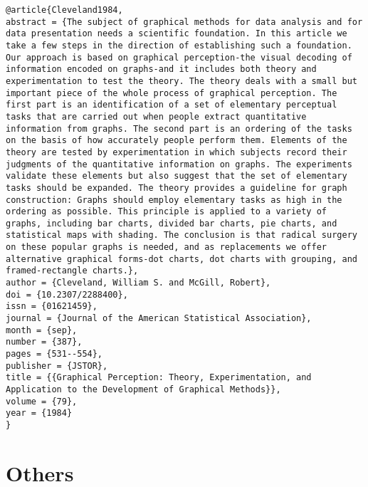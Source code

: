 \documentclass[
]{book}
\begin{document}
\begin{verbatim}
@article{Cleveland1984,
abstract = {The subject of graphical methods for data analysis and for data presentation needs a scientific foundation. In this article we take a few steps in the direction of establishing such a foundation. Our approach is based on graphical perception-the visual decoding of information encoded on graphs-and it includes both theory and experimentation to test the theory. The theory deals with a small but important piece of the whole process of graphical perception. The first part is an identification of a set of elementary perceptual tasks that are carried out when people extract quantitative information from graphs. The second part is an ordering of the tasks on the basis of how accurately people perform them. Elements of the theory are tested by experimentation in which subjects record their judgments of the quantitative information on graphs. The experiments validate these elements but also suggest that the set of elementary tasks should be expanded. The theory provides a guideline for graph construction: Graphs should employ elementary tasks as high in the ordering as possible. This principle is applied to a variety of graphs, including bar charts, divided bar charts, pie charts, and statistical maps with shading. The conclusion is that radical surgery on these popular graphs is needed, and as replacements we offer alternative graphical forms-dot charts, dot charts with grouping, and framed-rectangle charts.},
author = {Cleveland, William S. and McGill, Robert},
doi = {10.2307/2288400},
issn = {01621459},
journal = {Journal of the American Statistical Association},
month = {sep},
number = {387},
pages = {531--554},
publisher = {JSTOR},
title = {{Graphical Perception: Theory, Experimentation, and Application to the Development of Graphical Methods}},
volume = {79},
year = {1984}
}
\end{verbatim}

\hypertarget{others}{%
\section{Others}\label{others}}
\end{document}
